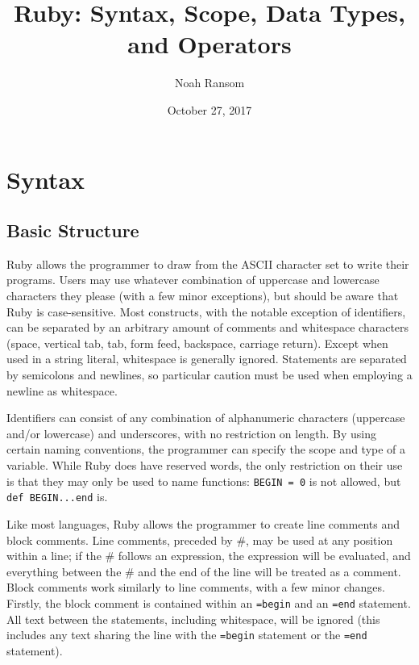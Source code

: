 \documentclass[12pt]{article}
\title{Ruby: Syntax, Scope, Data Types, and Operators}
\author{Noah Ransom}
\date{October 27, 2017}
\begin{document}
\maketitle

\pagebreak

\section{Syntax}
\subsection{Basic Structure}
Ruby allows the programmer to draw from the ASCII character set to write their programs. Users may use whatever combination of uppercase and lowercase characters they please (with a few minor exceptions), but should be aware that Ruby is case-sensitive. Most constructs, with the notable exception of identifiers, can be separated by an arbitrary amount of comments and whitespace characters (space, vertical tab, tab, form feed, backspace, carriage return). Except when used in a string literal, whitespace is generally ignored. Statements are separated by semicolons and newlines, so particular caution must be used when employing a newline as whitespace\cite{huihoo}.

Identifiers can consist of any combination of alphanumeric characters (uppercase and/or lowercase) and underscores, with no restriction on length. By using certain naming conventions, the programmer can specify the scope and type of a variable. While Ruby does have reserved words, the only restriction on their use is that they may only be used to name functions: \verb|BEGIN = 0| is not allowed, but \verb|def BEGIN...end| is\cite{syntut}\cite{huihoo}.

Like most languages, Ruby allows the programmer to create line comments and block comments. Line comments, preceded by \#, may be used at any position within a line; if the \# follows an expression, the expression will be evaluated, and everything between the \# and the end of the line will be treated as a comment. Block comments work similarly to line comments, with a few minor changes. Firstly, the block comment is contained within an \verb|=begin| and an \verb|=end| statement. All text between the statements, including whitespace, will be ignored (this includes any text sharing the line with the \verb|=begin| statement or the \verb|=end| statement)\cite{syntut}\cite{huihoo}.
\end{document}
